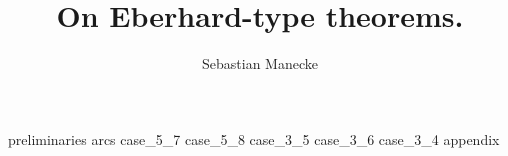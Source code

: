 \documentclass[a4paper, fleqn]{article}
\title{On Eberhard-type theorems.}
\author{Sebastian Manecke}
\begin{document}
\maketitle
\thispagestyle{empty}
{preliminaries}
{arcs}
{case_5_7}
{case_5_8}
{case_3_5}
{case_3_6}
{case_3_4}
{appendix}
\end{document}
